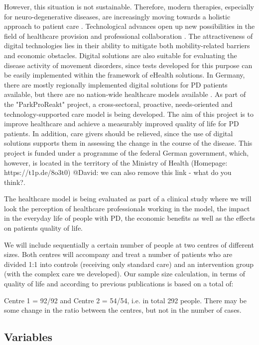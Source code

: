 \documentclass[number,12pt,review]{elsarticle}
\begin{document}
However, this situation is not sustainable. Therefore, modern therapies, especially for neuro-degenerative diseases, are increasingly moving towards a holistic approach to patient care  \citet{rajan2020integrated}. Technological advances open up new possibilities in the field of healthcare provision and professional collaboration  \citet{achey2014past}. The attractiveness of digital technologies lies in their ability to mitigate both mobility-related barriers and economic obstacles. Digital solutions are also suitable for evaluating the disease activity of movement disorders, since tests developed for this purpose can be easily implemented within the framework of eHealth solutions. In Germany, there are  mostly regionally implemented digital solutions for PD patients available, but there are no nation-wide healthcare models available \citet{Stangl2020, van2020building}.
As part of the "ParkProReakt" project, a cross-sectoral, proactive, needs-oriented and technology-supported care model is being developed. The aim of this project is to improve healthcare and achieve a measurably improved quality of life for PD patients. In addition, care givers should be relieved, since the use of digital solutions supports them in assessing the change in the course of the disease. This project is funded under a programme of the federal German government, which, however, is located in the territory of the Ministry of Health (Homepage: https://t1p.de/8o3t0) \ac{@David: we can also remove this link - what do you think?}. 

The healthcare model is being evaluated as part of a clinical study where we will look the perception of healthcare professionals working in the model, the impact in the everyday life of people with \ac{PD}, the economic benefits as well as the effects on patients quality of life.

We will include sequentially a certain number of people at two centres of different sizes. Both centres will accompany and treat a number of patients who are divided 1:1 into controls (receiving only standard care) and an intervention group (with the complex care we developed). Our sample size calculation, in terms of quality of life and according to previous publications \citet{Butterfield2017-uc, Mestre2021-od, horvath2017changes} is based on a total of:

Centre 1 = 92/92 and Centre 2 = 54/54, i.e. in total 292 people. There may be some change
in the ratio between the centres, but not in the number of cases.


\subsection{Variables}
\end{document}
